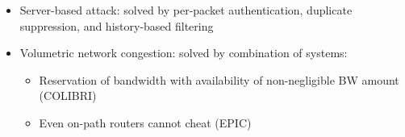 \documentclass[11pt,oneside,a4paper]{article}
\begin{document}
\vspace{-\topsep}
\begin{itemize}
	\setlength{\itemsep}{0pt}
	\setlength{\parskip}{0pt}
	\item Server-based attack: solved by per-packet authentication, duplicate suppression, and history-based filtering
	\item Volumetric network congestion: solved by combination of systems:
	\begin{itemize}
		\item Reservation of bandwidth with availability of non-negligible BW amount (COLIBRI)
		\item Even on-path routers cannot cheat (EPIC)
	\end{itemize}

\end{itemize}
\vspace{-\topsep}

\label{lastpage} %
\clearpage
{}



\clearpage
\appendix
{}
\end{document}

